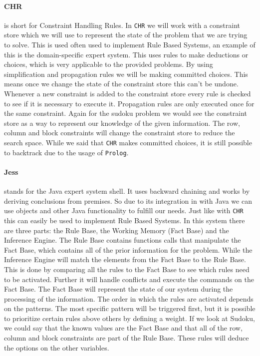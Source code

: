 \newpage
\paragraph*{CHR} is short for Constraint Handling Rules. 
In \texttt{CHR} we will work with a constraint store which we will use to represent the state of the problem that we are trying to solve.
This is used often used to implement Rule Based Systems, an example of this is the domain-specific expert system.
This uses rules to make deductions or choices, which is very applicable to the provided problems. 
By using simplification and propagation rules we will be making committed choices. 
This means once we change the state of the constraint store this can't be undone.
Whenever a new constraint is added to the constraint store every rule is checked to see if it is necessary to execute it.
Propagation rules are only executed once for the same constraint.
Again for the sudoku problem we would see the constraint store as a way to represent our knowledge of the given information.
The row, column and block constraints will change the constraint store to reduce the search space.
While we said that \texttt{CHR} makes committed choices, it is still possible to backtrack due to the usage of \texttt{Prolog}.
 
\paragraph*{Jess} stands for the Java expert system shell.
It uses backward chaining and works by deriving conclusions from premises.
So due to its integration in with Java we can use objects and other Java functionality to fulfill our needs.
Just like with \texttt{CHR} this can easily be used to implement Rule Based Systems.
In this system there are three parts: the Rule Base, the Working Memory (Fact Base) and the Inference Engine.
The Rule Base contains functions calls that manipulate the Fact Base, which contains all of the prior information for the problem.
While the Inference Engine will match the elements from the Fact Base to the Rule Base.
This is done by comparing all the rules to the Fact Base to see which rules need to be activated.
Further it will handle conflicts and execute the commands on the Fact Base.
The Fact Base will represent the state of our system during the processing of the information.
The order in which the rules are activated depends on the patterns. 
The most specific pattern will be triggered first, but it is possible to prioritize certain rules above others by defining a weight.
If we look at Sudoku, we could say that the known values are the Fact Base and that all of the row, column and block constraints are part of the Rule Base.
These rules will deduce the options on the other variables.

